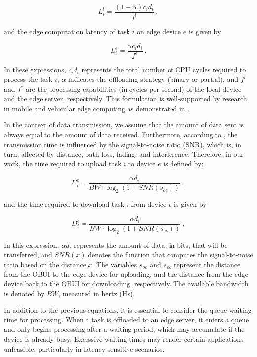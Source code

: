 \documentclass[iicol]{sn-jnl}
\begin{document}
\begin{equation}
L_i^l=\frac{(1-\alpha)c_i d_i}{f^l}~,
\end{equation}

and the edge computation latency of task $i$ on edge device $e$ is given by

\begin{equation}
L_i^e=\frac{\alpha c_i d_i}{f^e}~.
\end{equation}

In these expressions, $c_i d_i$ represents the total number of CPU cycles required to process the task $i$, $\alpha$ indicates the offloading strategy (binary or partial), and ${f^l}$ and ${f^e}$ are the processing capabilities (in cycles per second) of the local device and the edge server, respectively. This formulation is well-supported by research in mobile and vehicular edge computing as demonstrated in \cite{liu2021vehicular}\cite{bai2023dynamic}.

In the context of data transmission, we assume that the amount of data sent is always equal to the amount of data received. Furthermore, according to \cite{goldsmith2005wireless}, the transmission time is influenced by the signal-to-noise ratio (SNR), which is, in turn, affected by distance, path loss, fading, and interference. Therefore, in our work, the time required to upload task $i$ to device $e$ is defined by:

\begin{equation}
U_i^e = \frac{\alpha d_i}{BW \cdot \log_2(1 + SNR(s_{oe}))}~,
\end{equation}

and the time required to download task $i$ from device $e$ is given by

\begin{equation}
D_i^e = \frac{\alpha d_i}{BW \cdot \log_2(1 + SNR(s_{eo}))}~,
\end{equation}

In this expression, $\alpha d_i$ represents the amount of data, in bits, that will be transferred, and $SNR(x)$ denotes the function that computes the signal-to-noise ratio based on the distance $x$. The variables $s_{oe}$ and $s_{eo}$ represent the distance from the OBUI to the edge device for uploading, and the distance from the edge device back to the OBUI for downloading, respectively. The available bandwidth is denoted by $BW$, measured in hertz (Hz).

In addition to the previous equations, it is essential to consider the queue waiting time for processing. When a task is offloaded to an edge server, it enters a queue and only begins processing after a waiting period, which may accumulate if the device is already busy. Excessive waiting times may render certain applications unfeasible, particularly in latency-sensitive scenarios.
\end{document}
